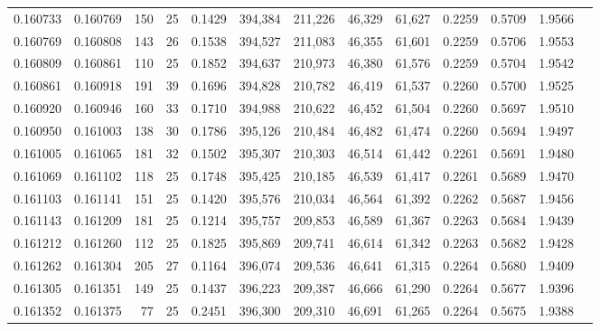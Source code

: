 \begin{tabular}{rrrrrrrrrrrrr}
0.160733 & 0.160769 & 150 &  25 &                                     0.1429 & 394,384 & 211,226 &  46,329 &  61,627 & 0.2259 & 0.5709 & 1.9566 \\
0.160769 & 0.160808 & 143 &  26 &                                     0.1538 & 394,527 & 211,083 &  46,355 &  61,601 & 0.2259 & 0.5706 & 1.9553 \\
0.160809 & 0.160861 & 110 &  25 &                                     0.1852 & 394,637 & 210,973 &  46,380 &  61,576 & 0.2259 & 0.5704 & 1.9542 \\
0.160861 & 0.160918 & 191 &  39 &                                     0.1696 & 394,828 & 210,782 &  46,419 &  61,537 & 0.2260 & 0.5700 & 1.9525 \\
0.160920 & 0.160946 & 160 &  33 &                                     0.1710 & 394,988 & 210,622 &  46,452 &  61,504 & 0.2260 & 0.5697 & 1.9510 \\
0.160950 & 0.161003 & 138 &  30 &                                     0.1786 & 395,126 & 210,484 &  46,482 &  61,474 & 0.2260 & 0.5694 & 1.9497 \\
0.161005 & 0.161065 & 181 &  32 &                                     0.1502 & 395,307 & 210,303 &  46,514 &  61,442 & 0.2261 & 0.5691 & 1.9480 \\
0.161069 & 0.161102 & 118 &  25 &                                     0.1748 & 395,425 & 210,185 &  46,539 &  61,417 & 0.2261 & 0.5689 & 1.9470 \\
0.161103 & 0.161141 & 151 &  25 &                                     0.1420 & 395,576 & 210,034 &  46,564 &  61,392 & 0.2262 & 0.5687 & 1.9456 \\
0.161143 & 0.161209 & 181 &  25 &                                     0.1214 & 395,757 & 209,853 &  46,589 &  61,367 & 0.2263 & 0.5684 & 1.9439 \\
0.161212 & 0.161260 & 112 &  25 &                                     0.1825 & 395,869 & 209,741 &  46,614 &  61,342 & 0.2263 & 0.5682 & 1.9428 \\
0.161262 & 0.161304 & 205 &  27 &                                     0.1164 & 396,074 & 209,536 &  46,641 &  61,315 & 0.2264 & 0.5680 & 1.9409 \\
0.161305 & 0.161351 & 149 &  25 &                                     0.1437 & 396,223 & 209,387 &  46,666 &  61,290 & 0.2264 & 0.5677 & 1.9396 \\
0.161352 & 0.161375 &  77 &  25 &                                     0.2451 & 396,300 & 209,310 &  46,691 &  61,265 & 0.2264 & 0.5675 & 1.9388 \\

\end{tabular}
